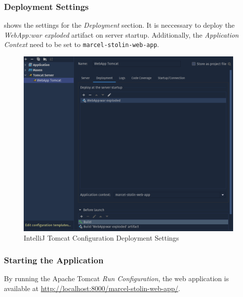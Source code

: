 \subsubsection{Deployment Settings}
 shows the settings for the \textit{Deployment} section. It is neccessary to deploy the \textit{WebApp:war exploded} artifact on server startup. Additionally, the \textit{Application Context} need to be set to \texttt{marcel-stolin-web-app}.
\begin{figure}[h]
\centering
\includegraphics[scale=0.2]{images/03_depl/tomcat-config-2}
\caption{IntelliJ Tomcat Configuration Deployment Settings}
\label{fig:03_depl_webapp_intellij_config2}
\end{figure}

\subsubsection{Starting the Application}
By running the Apache Tomcat \textit{Run Configuration}, the web application is available at \url{http://localhost:8000/marcel-stolin-web-app/}.
